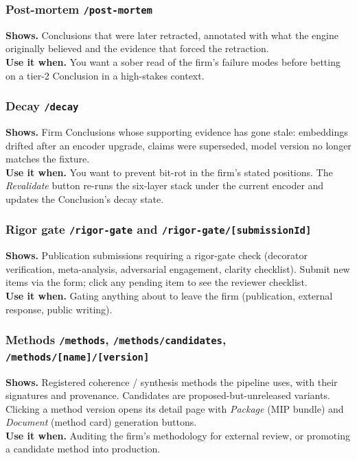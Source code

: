 \documentclass[11pt,letterpaper]{article}
\newcommand{\file}[1]{\texttt{#1}}
\newcommand{\tab}[1]{\textsl{#1}}
\begin{document}
\subsubsection*{Post-mortem \hfill \file{/post-mortem}}
\textbf{Shows.} Conclusions that were later retracted, annotated with what the engine originally believed and the evidence that forced the retraction. \\
\textbf{Use it when.} You want a sober read of the firm's failure modes before betting on a tier-2 Conclusion in a high-stakes context.

\subsubsection*{Decay \hfill \file{/decay}}
\textbf{Shows.} Firm Conclusions whose supporting evidence has gone stale: embeddings drifted after an encoder upgrade, claims were superseded, model version no longer matches the fixture. \\
\textbf{Use it when.} You want to prevent bit-rot in the firm's stated positions. The \tab{Revalidate} button re-runs the six-layer stack under the current encoder and updates the Conclusion's decay state.

\subsubsection*{Rigor gate \hfill \file{/rigor-gate} and \file{/rigor-gate/[submissionId]}}
\textbf{Shows.} Publication submissions requiring a rigor-gate check (decorator verification, meta-analysis, adversarial engagement, clarity checklist). Submit new items via the form; click any pending item to see the reviewer checklist. \\
\textbf{Use it when.} Gating anything about to leave the firm (publication, external response, public writing).

\subsubsection*{Methods \hfill \file{/methods}, \file{/methods/candidates}, \file{/methods/[name]/[version]}}
\textbf{Shows.} Registered coherence / synthesis methods the pipeline uses, with their signatures and provenance. Candidates are proposed-but-unreleased variants. Clicking a method version opens its detail page with \tab{Package} (MIP bundle) and \tab{Document} (method card) generation buttons. \\
\textbf{Use it when.} Auditing the firm's methodology for external review, or promoting a candidate method into production.
\end{document}

